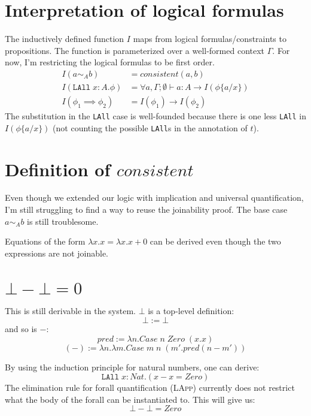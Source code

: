 \documentclass{article}
\begin{document}
\section{Interpretation of logical formulas}
The inductively defined function $I$ maps from logical
formulas/constraints to propositions. The function is parameterized
over a well-formed context $\Gamma$.
For now, I'm restricting the logical formulas to be first order.
\begin{equation*}
  \begin{split}
    I(a \sim_A b) &= consistent(a,b) \\
    I(\texttt{LAll}\;x : A . \phi) &= \forall a, \Gamma;\emptyset
    \vdash a : A \rightarrow  I(\phi\{a / x\}) \\
    I(\phi_1 \implies \phi_2) &= I(\phi_1) \rightarrow I(\phi_2)
  \end{split}
\end{equation*}
The substitution in the \texttt{LAll} case is well-founded because
there is one less \texttt{LAll} in $I(\phi\{a / x\})$ (not counting
the possible \texttt{LAll}s in the annotation of $t$).



\section{Definition of $consistent$}
Even though we extended our logic with implication and universal
quantification, I'm still struggling to find a way to reuse the
joinability proof. The base case $a \sim_A b$ is still troublesome.

Equations of the form $\lambda x. x = \lambda x. x + 0$ can be derived
even though the two expressions are not joinable.


\section{$\bot - \bot = 0$}
This is still derivable in the system. $\bot$ is a top-level
definition:
\[\bot := \bot\]
and so is $-$:
\[pred := \lambda n. Case\;n\;Zero\;(x . x)\]
\[(-) := \lambda n .\lambda m. Case\;m\;n\;(m' . pred (n - m'))\]

By using the induction principle for natural numbers, one can derive:
\[\texttt{LAll}\;x : Nat. (x - x = Zero)\]
The elimination rule for forall quantification (\textsc{LApp})
currently does not restrict what the body of the forall can be
instantiated to. This will give us:
\[\bot - \bot = Zero\]
\end{document}
